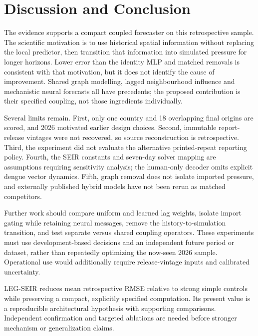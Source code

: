 \documentclass[conference]{IEEEtran}
\begin{document}
\section{Discussion and Conclusion}
The evidence supports a compact coupled forecaster on this retrospective sample. The scientific motivation is to use historical spatial information without replacing the local predictor, then transition that information into simulated pressure for longer horizons. Lower error than the identity MLP and matched removals is consistent with that motivation, but it does not identify the cause of improvement. Shared graph modelling, lagged neighbourhood influence and mechanistic neural forecasts all have precedents; the proposed contribution is their specified coupling, not those ingredients individually.

Several limits remain. First, only one country and 18 overlapping final origins are scored, and 2026 motivated earlier design choices. Second, immutable report-release vintages were not recovered, so source reconstruction is retrospective. Third, the experiment did not evaluate the alternative printed-repeat reporting policy. Fourth, the SEIR constants and seven-day solver mapping are assumptions requiring sensitivity analysis; the human-only decoder omits explicit dengue vector dynamics. Fifth, graph removal does not isolate imported pressure, and externally published hybrid models have not been rerun as matched competitors.

Further work should compare uniform and learned lag weights, isolate import gating while retaining neural messages, remove the history-to-simulation transition, and test separate versus shared coupling operators. These experiments must use development-based decisions and an independent future period or dataset, rather than repeatedly optimizing the now-seen 2026 sample. Operational use would additionally require release-vintage inputs and calibrated uncertainty.

LEG-SEIR reduces mean retrospective RMSE relative to strong simple controls while preserving a compact, explicitly specified computation. Its present value is a reproducible architectural hypothesis with supporting comparisons. Independent confirmation and targeted ablations are needed before stronger mechanism or generalization claims.



\end{document}
